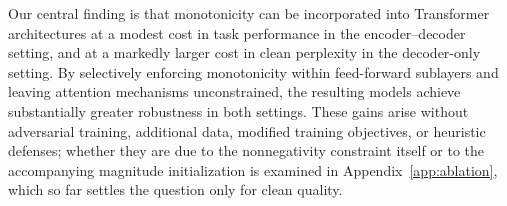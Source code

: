 \documentclass{article}
\theoremstyle{plain}
\theoremstyle{definition}
\theoremstyle{remark}
\begin{document}




Our central finding is that monotonicity can be incorporated
into Transformer architectures at a modest cost in task performance in the
encoder--decoder setting, and at a markedly larger cost in clean perplexity in the
decoder-only setting. By selectively enforcing monotonicity within feed-forward
sublayers and leaving attention mechanisms unconstrained, the resulting models
achieve substantially greater robustness in both settings. These gains arise
without adversarial training, additional data, modified training objectives, or
heuristic defenses; whether they are due to the nonnegativity constraint itself or
to the accompanying magnitude initialization is examined in
Appendix~\ref{app:ablation}, which so far settles the question only for clean
quality.
\end{document}

